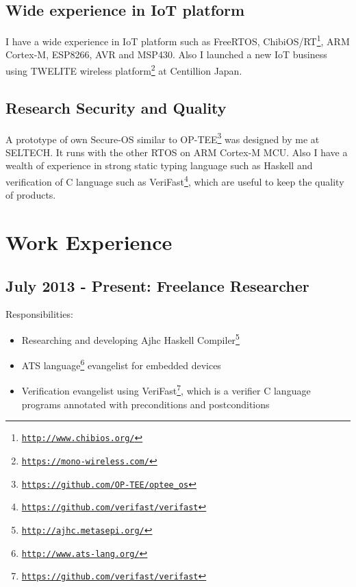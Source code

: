 \documentclass[letterpaper]{article}
\begin{document}
\subsection*{Wide experience in IoT platform}

I have a wide experience in IoT platform such as FreeRTOS, ChibiOS/RT\footnote{\href{http://www.chibios.org/}{\tt http://www.chibios.org/}}, ARM Cortex-M, ESP8266, AVR and MSP430. Also I launched a new IoT business using TWELITE wireless platform\footnote{\href{https://mono-wireless.com/}{\tt https://mono-wireless.com/}} at Centillion Japan.

\subsection*{Research Security and Quality}

A prototype of own Secure-OS similar to OP-TEE\footnote{\href{https://github.com/OP-TEE/optee\_os}{\tt https://github.com/OP-TEE/optee\_os}} was designed by me at SELTECH. It runs with the other RTOS on ARM Cortex-M MCU. Also I have a wealth of experience in strong static typing language such as Haskell and verification of C language such as VeriFast\footnote{\href{https://github.com/verifast/verifast}{\tt https://github.com/verifast/verifast}}, which are useful to keep the quality of products.

\newpage

\section*{Work Experience}

\subsection*{July 2013 - Present: Freelance Researcher}

\noindent Responsibilities:

\begin{itemize}
  \item Researching and developing Ajhc Haskell Compiler\footnote{\href{http://ajhc.metasepi.org/}{\tt http://ajhc.metasepi.org/}}
  \item ATS language\footnote{\href{http://www.ats-lang.org/}{\tt http://www.ats-lang.org/}} evangelist for embedded devices
  \item Verification evangelist using VeriFast\footnote{\href{https://github.com/verifast/verifast}{\tt https://github.com/verifast/verifast}}, which is a verifier C language programs annotated with preconditions and postconditions
\end{itemize}
\end{document}
